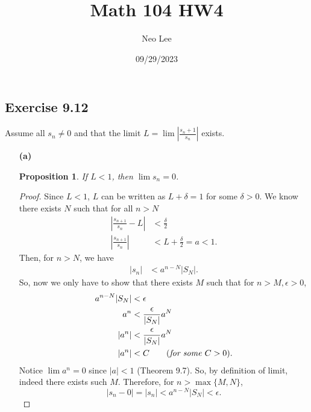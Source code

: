 \documentclass{article}
\title{Math 104 HW4}
\author{Neo Lee}
\date{09/29/2023}
\newtheorem{proposition}[thm]{Proposition}
\begin{document}
 

\maketitle 

\subsection*{Exercise 9.12}
Assume all $s_n\neq 0$ and that the limit $L=\lim\left|\frac{s_n+1}{s_n}\right|$ exists.
\begin{enumerate}
    \item[\textbf{(a)}]
    \begin{proposition}
        If $L<1$, then $\lim s_n=0$.
    \end{proposition}
    \begin{proof}
        Since $L<1$, $L$ can be written as $L + \delta = 1$ for some $\delta>0$. We know there 
        exists $N$ such that for all $n>N$
        \begin{align*}
            \left|\frac{s_{n+1}}{s_n}-L\right| & < \frac{\delta}{2} \\
            \left|\frac{s_{n+1}}{s_n}\right| & < L + \frac{\delta}{2} = a < 1.
        \end{align*}
        Then, for $n> N$, we have 
        \begin{align*}
            |s_n| & < a^{n-N}|S_N|.
        \end{align*}
        So, now we only have to show that there exists $M$ such that for $n > M, \epsilon>0$, 
        \begin{align*}
            a^{n-N}|S_N| & < \epsilon \\
            a^n & < \frac{\epsilon}{|S_N|}a^N \\
            |a^n| & < \frac{\epsilon}{|S_N|}a^N \\
            |a^n| & < C \qquad (\emph{for some }C>0 ).
        \end{align*}
        Notice $\lim a^n=0$ since $|a|<1$ (Theorem 9.7). So, by definition of limit, indeed there 
        exists such $M$. Therefore, for $n>\max\{M,N\}$, $$|s_n-0| =|s_n| <a^{n-N}|S_N|<\epsilon.$$
    \end{proof}


\end{enumerate}
\end{document}
